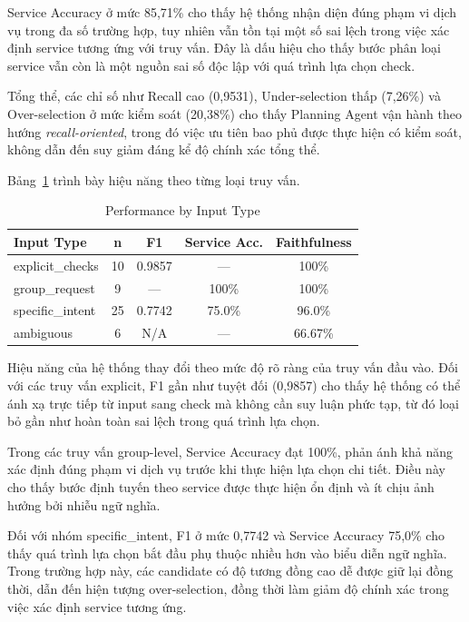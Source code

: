 Service Accuracy ở mức 85{,}71\% cho thấy hệ thống nhận diện đúng phạm vi dịch vụ trong đa số trường hợp, tuy nhiên vẫn tồn tại một số sai lệch trong việc xác định service tương ứng với truy vấn. Đây là dấu hiệu cho thấy bước phân loại service vẫn còn là một nguồn sai số độc lập với quá trình lựa chọn check.

Tổng thể, các chỉ số như Recall cao (0{,}9531), Under-selection thấp (7{,}26\%) và Over-selection ở mức kiểm soát (20{,}38\%) cho thấy Planning Agent vận hành theo hướng \textit{recall-oriented}, trong đó việc ưu tiên bao phủ được thực hiện có kiểm soát, không dẫn đến suy giảm đáng kể độ chính xác tổng thể.

\vspace{0.5em}

Bảng~\ref{tab:planning_breakdown} trình bày hiệu năng theo từng loại truy vấn.

\begin{table}[!htb]
\centering
\caption{Performance by Input Type}
\label{tab:planning_breakdown}
\begin{tabular}{l c c c c}
\hline
\textbf{Input Type} & \textbf{n} & \textbf{F1} & \textbf{Service Acc.} & \textbf{Faithfulness} \\
\hline
explicit\_checks & 10 & 0.9857 & --- & 100\% \\
group\_request & 9 & --- & 100\% & 100\% \\
specific\_intent & 25 & 0.7742 & 75.0\% & 96.0\% \\
ambiguous & 6 & N/A & --- & 66.67\% \\
\hline
\end{tabular}
\end{table}

Hiệu năng của hệ thống thay đổi theo mức độ rõ ràng của truy vấn đầu vào. Đối với các truy vấn explicit, F1 gần như tuyệt đối (0{,}9857) cho thấy hệ thống có thể ánh xạ trực tiếp từ input sang check mà không cần suy luận phức tạp, từ đó loại bỏ gần như hoàn toàn sai lệch trong quá trình lựa chọn.

Trong các truy vấn group-level, Service Accuracy đạt 100\%, phản ánh khả năng xác định đúng phạm vi dịch vụ trước khi thực hiện lựa chọn chi tiết. Điều này cho thấy bước định tuyến theo service được thực hiện ổn định và ít chịu ảnh hưởng bởi nhiễu ngữ nghĩa.

Đối với nhóm specific\_intent, F1 ở mức 0{,}7742 và Service Accuracy 75{,}0\% cho thấy quá trình lựa chọn bắt đầu phụ thuộc nhiều hơn vào biểu diễn ngữ nghĩa. Trong trường hợp này, các candidate có độ tương đồng cao dễ được giữ lại đồng thời, dẫn đến hiện tượng over-selection, đồng thời làm giảm độ chính xác trong việc xác định service tương ứng.

